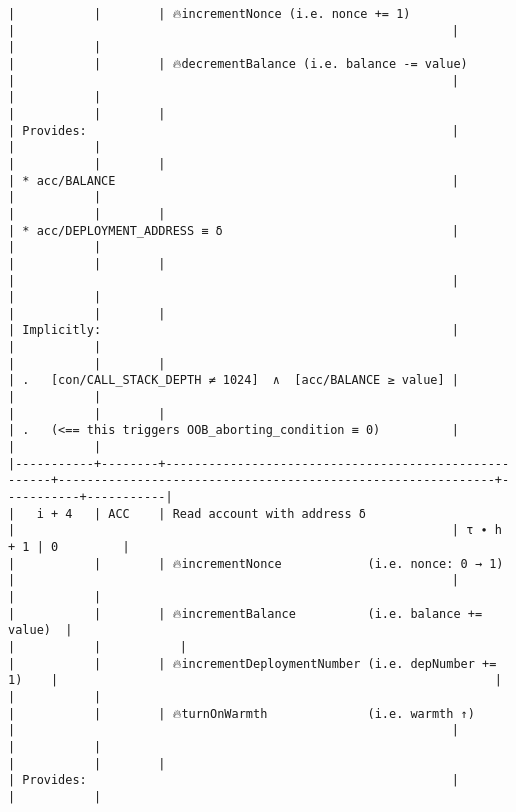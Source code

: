 \documentclass[varwidth=\maxdimen,margin=0.5cm,multi={verbatim}]{standalone}
\begin{document}
\begin{verbatim}
|           |        | 🔥incrementNonce (i.e. nonce += 1)                   |                                                             |           |           |
|           |        | 🔥decrementBalance (i.e. balance -= value)           |                                                             |           |           |
|           |        |                                                      | Provides:                                                   |           |           |
|           |        |                                                      | * acc/BALANCE                                               |           |           |
|           |        |                                                      | * acc/DEPLOYMENT_ADDRESS ≡ δ                                |           |           |
|           |        |                                                      |                                                             |           |           |
|           |        |                                                      | Implicitly:                                                 |           |           |
|           |        |                                                      | .   [con/CALL_STACK_DEPTH ≠ 1024]  ∧  [acc/BALANCE ≥ value] |           |           |
|           |        |                                                      | .   (<== this triggers OOB_aborting_condition ≡ 0)          |           |           |
|-----------+--------+------------------------------------------------------+-------------------------------------------------------------+-----------+-----------|
|   i + 4   | ACC    | Read account with address δ                          |                                                             | τ ∙ h + 1 | 0         |
|           |        | 🔥incrementNonce            (i.e. nonce: 0 → 1)      |                                                             |           |           |
|           |        | 🔥incrementBalance          (i.e. balance += value)  |                                                             |           |           |
|           |        | 🔥incrementDeploymentNumber (i.e. depNumber += 1)    |                                                             |           |           |
|           |        | 🔥turnOnWarmth              (i.e. warmth ↑)          |                                                             |           |           |
|           |        |                                                      | Provides:                                                   |           |           |

\end{verbatim}
\end{document}
